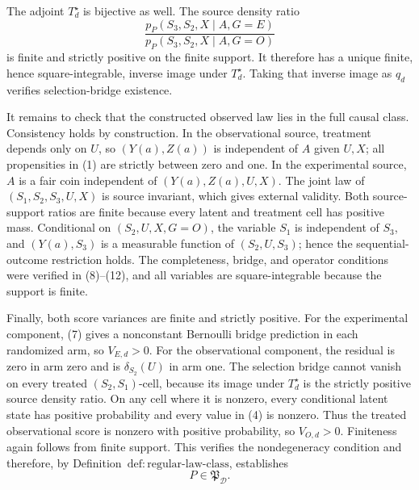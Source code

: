 The adjoint \(T_d^\star\) is bijective as well.  The source density ratio
\[
 \frac{p_P(S_3,S_2,X\mid A,G=E)}
 {p_P(S_3,S_2,X\mid A,G=O)}
\]
is finite and strictly positive on the finite support.  It therefore has a unique finite, hence square-integrable, inverse image under \(T_d^\star\).  Taking that inverse image as \(q_d\) verifies selection-bridge existence.

It remains to check that the constructed observed law lies in the full causal class.  Consistency holds by construction.  In the observational source, treatment depends only on \(U\), so \((Y(a),Z(a))\) is independent of \(A\) given \(U,X\); all propensities in (1) are strictly between zero and one.  In the experimental source, \(A\) is a fair coin independent of \((Y(a),Z(a),U,X)\).  The joint law of \((S_1,S_2,S_3,U,X)\) is source invariant, which gives external validity.  Both source-support ratios are finite because every latent and treatment cell has positive mass.  Conditional on \((S_2,U,X,G=O)\), the variable \(S_1\) is independent of \(S_3\), and \((Y(a),S_3)\) is a measurable function of \((S_2,U,S_3)\); hence the sequential-outcome restriction holds.  The completeness, bridge, and operator conditions were verified in (8)--(12), and all variables are square-integrable because the support is finite.

Finally, both score variances are finite and strictly positive.  For the experimental component, (7) gives a nonconstant Bernoulli bridge prediction in each randomized arm, so \(V_{E,d}>0\).  For the observational component, the residual is zero in arm zero and is \(\delta_{S_2}(U)\) in arm one.  The selection bridge cannot vanish on every treated \((S_2,S_1)\)-cell, because its image under \(T_d^\star\) is the strictly positive source density ratio.  On any cell where it is nonzero, every conditional latent state has positive probability and every value in (4) is nonzero.  Thus the treated observational score is nonzero with positive probability, so \(V_{O,d}>0\).  Finiteness again follows from finite support.  This verifies the nondegeneracy condition and therefore, by Definition~\(\mathrm{def{:}regular\text{-}law\text{-}class}\), establishes
\[
 P\in\mathfrak P_{\mathcal D}.
 \tag{13}
\]


